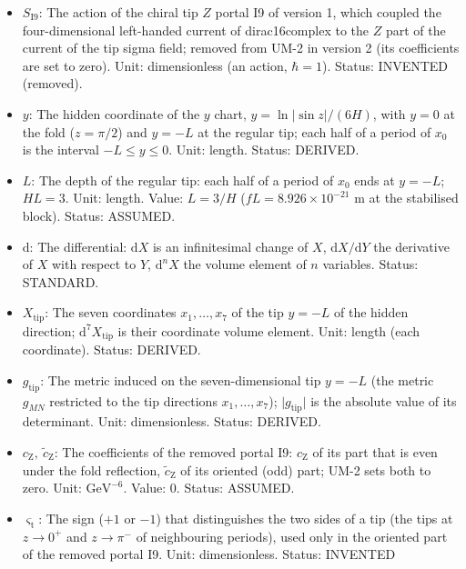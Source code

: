 \documentclass[
  10pt,
]{article}
\providecommand{\tightlist}{%
  \setlength{\itemsep}{0pt}\setlength{\parskip}{0pt}}
\begin{document}
\begin{itemize}
\tightlist
\item
  \(S_{\mathrm{I9}}\): The action of the chiral tip \(Z\) portal I9 of
  version 1, which coupled the four-dimensional left-handed current of
  dirac16complex to the \(Z\) part of the current of the tip sigma
  field; removed from UM-2 in version 2 (its coefficients are set to
  zero). Unit: dimensionless (an action, \(\hbar = 1\)). Status:
  INVENTED (removed).
\item
  \(y\): The hidden coordinate of the \(y\) chart,
  \(y = \ln\lvert\sin z\rvert/(6H)\), with \(y = 0\) at the fold
  (\(z = \pi/2\)) and \(y = -L\) at the regular tip; each half of a
  period of \(x_0\) is the interval \(-L \le y \le 0\). Unit: length.
  Status: DERIVED.
\item
  \(L\): The depth of the regular tip: each half of a period of \(x_0\)
  ends at \(y = -L\); \(HL = 3\). Unit: length. Value: \(L = 3/H\)
  (\(fL = 8.926\times10^{-21}\) m at the stabilised block). Status:
  ASSUMED.
\item
  \(\mathrm{d}\): The differential: \(\mathrm{d}X\) is an infinitesimal
  change of \(X\), \(\mathrm{d}X/\mathrm{d}Y\) the derivative of \(X\)
  with respect to \(Y\), \(\mathrm{d}^nX\) the volume element of \(n\)
  variables. Status: STANDARD.
\item
  \(X_{\mathrm{tip}}\): The seven coordinates \(x_1, \dots, x_7\) of the
  tip \(y = -L\) of the hidden direction;
  \(\mathrm{d}^7X_{\mathrm{tip}}\) is their coordinate volume element.
  Unit: length (each coordinate). Status: DERIVED.
\item
  \(g_{\mathrm{tip}}\): The metric induced on the seven-dimensional tip
  \(y = -L\) (the metric \(g_{MN}\) restricted to the tip directions
  \(x_1, \dots, x_7\)); \(\lvert g_{\mathrm{tip}}\rvert\) is the
  absolute value of its determinant. Unit: dimensionless. Status:
  DERIVED.
\item
  \(c_{\mathrm{Z}},\ \tilde c_{\mathrm{Z}}\): The coefficients of the
  removed portal I9: \(c_{\mathrm{Z}}\) of its part that is even under
  the fold reflection, \(\tilde c_{\mathrm{Z}}\) of its oriented (odd)
  part; UM-2 sets both to zero. Unit: \(\mathrm{GeV}^{-6}\). Value: 0.
  Status: ASSUMED.
\item
  \(\varsigma_{\mathrm{t}}\): The sign (\(+1\) or \(-1\)) that
  distinguishes the two sides of a tip (the tips at \(z \to 0^+\) and
  \(z \to \pi^-\) of neighbouring periods), used only in the oriented
  part of the removed portal I9. Unit: dimensionless. Status: INVENTED

\end{itemize}
\end{document}
